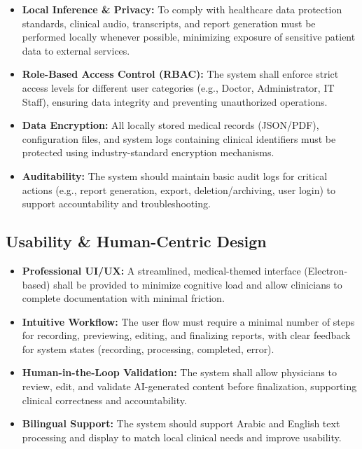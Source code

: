 \begin{itemize}
    \item \textbf{Local Inference \& Privacy:} To comply with healthcare data protection standards, clinical audio, transcripts, and report generation must be performed locally whenever possible, minimizing exposure of sensitive patient data to external services.

    \item \textbf{Role-Based Access Control (RBAC):} The system shall enforce strict access levels for different user categories (e.g., Doctor, Administrator, IT Staff), ensuring data integrity and preventing unauthorized operations.

    \item \textbf{Data Encryption:} All locally stored medical records (JSON/PDF), configuration files, and system logs containing clinical identifiers must be protected using industry-standard encryption mechanisms.

    \item \textbf{Auditability:} The system should maintain basic audit logs for critical actions (e.g., report generation, export, deletion/archiving, user login) to support accountability and troubleshooting.
\end{itemize}

\subsection{Usability \& Human-Centric Design}\label{sec:analysis:nfr:usability}

\begin{itemize}
    \item \textbf{Professional UI/UX:} A streamlined, medical-themed interface (Electron-based) shall be provided to minimize cognitive load and allow clinicians to complete documentation with minimal friction.

    \item \textbf{Intuitive Workflow:} The user flow must require a minimal number of steps for recording, previewing, editing, and finalizing reports, with clear feedback for system states (recording, processing, completed, error).

    \item \textbf{Human-in-the-Loop Validation:} The system shall allow physicians to review, edit, and validate AI-generated content before finalization, supporting clinical correctness and accountability.

    \item \textbf{Bilingual Support:} The system should support Arabic and English text processing and display to match local clinical needs and improve usability.
\end{itemize}


